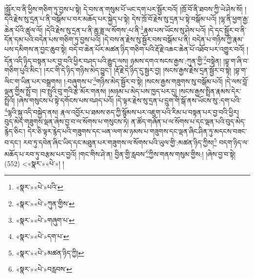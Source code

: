 །སྦྱོར་བ་ནི་ཕྱིས་གཅིག་ཏུ་བྱས་པ་སྟེ། དེ་བས་ན་གསུམ་པོ་ཡང་དག་པར་སྦྱོར་བའོ། །ཁྲོ་བོ་ནི་ཐབས་ཀྱི་ཡེ་ཤེས་སོ། །དེའི་རྗེས་སུ་དྲན་པ་ནི་བསྒོམ་པ་བར་མཆོད་པར་སྐྱེད་པ་སྟེ། དེས་ཁྲོ་བོ་རྗེས་སུ་དྲན་པ་སྟེ་བསྒོམ་པའོ། །ལྷ་ནི་ཕྱག་རྒྱ་ཆེན་པོའི་ཚུལ་ལོ། །དེའི་རྗེས་སུ་དྲན་པ་ནི་ཆུ་ཟླ་ལ་སོགས་:པ་ནི་\footnote{«སྣར་»«པེ་»པའི་}རྣམ་པས་ཡོངས་སུ་ཤེས་པའོ། །དེ་དང་སྦྱོར་བ་ནི་དོན་དམ་པའི་བདེན་པས་གཅིག་ཏུ་བྱས་པའོ། །དེ་བས་ན་རྗེས་སུ་སྦྱོར་བས་བསྒོམ་པ་ནི། བདེན་པ་གཉིས་ཀྱི་རྣམ་པས་དམིགས་ན་བྱང་ཆུབ་སྟེ། བདེ་བ་ཆེན་པོར་མཚན་ཉིད་གཅིག་པའི་རྡོ་རྗེ་འཆང་ཆེན་པོ་འཐོབ་པར་འགྱུར་བའོ། །དོན་འདི་ཉིད་བསྟན་པར་བྱ་བའི་ཕྱིར་བཤད་པའི་རྒྱུད་ལས། ཉམས་དགའ་སངས་རྒྱས་:ཀུན་གྱི་\footnote{«སྣར་»«པེ་»ཀུན་གྱིས་}བསྟེན། །བྷ་ག་ཞི་བ་གཅིག་པུའི་མིང་། །རང་གི་དེ་ཉིད་གཉིས་མེད་བྱུང་། །རྡོ་རྗེ་དེ་ཉིད་དུ་སྦྱར་བྱ། །སངས་རྒྱས་རྗེས་དྲན་སྦྱོར་བ་སྟེ། །བྷ་ག་ལིང་ག་ཡིན་པར་བསྒྲགས། །:བཞུགས་པ་\footnote{«སྣར་»«པེ་»གཞུག་པ་}གཉིས་མེད་སྦྱོར་བ་སྟེ། །སངས་རྒྱས་གཟུགས་སུ་བསྒོམ་པའོ། །དེ་ལས་བློ་ལྡན་གྱིས་སྤྲོ་བ། །བ་སྤུའི་བུ་གའི་རྩེ་མོར་གནས། །མཉམ་པ་མེད་པས་ཁྱད་པར་དུ། །སངས་རྒྱས་སྤྲིན་རྣམས་དེར་སྤྲོའོ། །ཞེས་གསུངས་པ་སྟེ་དགོངས་པས་བཤད་པའོ། །དེ་ལྟར་རྗེས་སུ་དྲན་པ་དྲུག་གི་སྒོ་ནས་ཡོངས་སུ་:དག་པའི་\footnote{«སྣར་»«པེ་»དག་པ་}ལྷའི་སྐུ་འདི་བསྐྱེད་ནས། རྣལ་འབྱོར་པ་ཐམས་ཅད་ཀྱི་སྙོམས་པར་འཇུག་པའི་རིམ་པ་བསྟན་པར་བྱ་བའི་ཕྱིར། བུད་མེད་གཟུགས་ལྡན་ཞེས་བྱ་བ་ལ་སོགས་པ་གསུངས་ཏེ། ན་ཚོད་གཞོན་པ་ལ་སོགས་པ་དང་ལྡན་པའི་བུད་མེད་རྙེད་ཅིང་། དེར་ཅི་ལྟར་རྙེད་པའི་གཟུགས་དང་ཡན་ལག་མ་ཉམས་པ་གཟུགས་དང་ལྡན་ཞིང་ཤིན་ཏུ་མདངས་བཟང་བ་དང་། རབ་ཏུ་དབེན་ཞིང་ཡིད་དང་མཐུན་པར་གཟུགས་ལ་སོགས་པའི་ཡུལ་གྱི་:མཚན་ཉིད་ཀྱིས།\footnote{«སྣར་»«པེ་»མཚན་ཉིད་ཀྱི།} བདག་ཉིད་ལ་མཆོད་པ་རབ་ཏུ་བརྩམ་པར་བྱའོ། །གང་གིས་ཤེ་ན། བྱིན་གྱི་རླབས་\footnote{«སྣར་»«པེ་»བརླབས་}ཀྱིས་གནས་གསུམ་གྱིས:། །ཞེས་བྱ་བ་སྟེ། (552) <«སྣར་»«པེ་»། །
